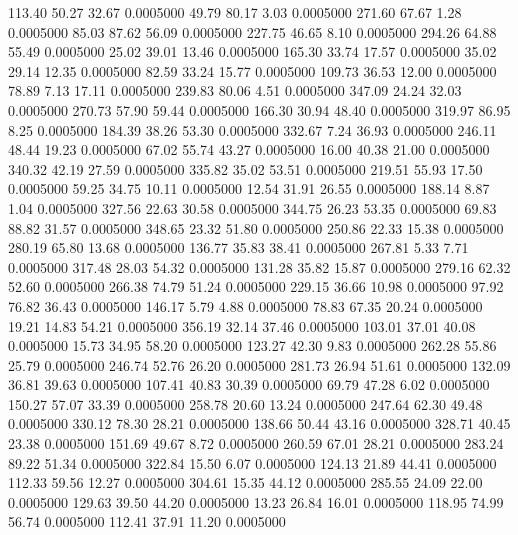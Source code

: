  113.40   50.27   32.67   0.0005000
  49.79   80.17    3.03   0.0005000
 271.60   67.67    1.28   0.0005000
  85.03   87.62   56.09   0.0005000
 227.75   46.65    8.10   0.0005000
 294.26   64.88   55.49   0.0005000
  25.02   39.01   13.46   0.0005000
 165.30   33.74   17.57   0.0005000
  35.02   29.14   12.35   0.0005000
  82.59   33.24   15.77   0.0005000
 109.73   36.53   12.00   0.0005000
  78.89    7.13   17.11   0.0005000
 239.83   80.06    4.51   0.0005000
 347.09   24.24   32.03   0.0005000
 270.73   57.90   59.44   0.0005000
 166.30   30.94   48.40   0.0005000
 319.97   86.95    8.25   0.0005000
 184.39   38.26   53.30   0.0005000
 332.67    7.24   36.93   0.0005000
 246.11   48.44   19.23   0.0005000
  67.02   55.74   43.27   0.0005000
  16.00   40.38   21.00   0.0005000
 340.32   42.19   27.59   0.0005000
 335.82   35.02   53.51   0.0005000
 219.51   55.93   17.50   0.0005000
  59.25   34.75   10.11   0.0005000
  12.54   31.91   26.55   0.0005000
 188.14    8.87    1.04   0.0005000
 327.56   22.63   30.58   0.0005000
 344.75   26.23   53.35   0.0005000
  69.83   88.82   31.57   0.0005000
 348.65   23.32   51.80   0.0005000
 250.86   22.33   15.38   0.0005000
 280.19   65.80   13.68   0.0005000
 136.77   35.83   38.41   0.0005000
 267.81    5.33    7.71   0.0005000
 317.48   28.03   54.32   0.0005000
 131.28   35.82   15.87   0.0005000
 279.16   62.32   52.60   0.0005000
 266.38   74.79   51.24   0.0005000
 229.15   36.66   10.98   0.0005000
  97.92   76.82   36.43   0.0005000
 146.17    5.79    4.88   0.0005000
  78.83   67.35   20.24   0.0005000
  19.21   14.83   54.21   0.0005000
 356.19   32.14   37.46   0.0005000
 103.01   37.01   40.08   0.0005000
  15.73   34.95   58.20   0.0005000
 123.27   42.30    9.83   0.0005000
 262.28   55.86   25.79   0.0005000
 246.74   52.76   26.20   0.0005000
 281.73   26.94   51.61   0.0005000
 132.09   36.81   39.63   0.0005000
 107.41   40.83   30.39   0.0005000
  69.79   47.28    6.02   0.0005000
 150.27   57.07   33.39   0.0005000
 258.78   20.60   13.24   0.0005000
 247.64   62.30   49.48   0.0005000
 330.12   78.30   28.21   0.0005000
 138.66   50.44   43.16   0.0005000
 328.71   40.45   23.38   0.0005000
 151.69   49.67    8.72   0.0005000
 260.59   67.01   28.21   0.0005000
 283.24   89.22   51.34   0.0005000
 322.84   15.50    6.07   0.0005000
 124.13   21.89   44.41   0.0005000
 112.33   59.56   12.27   0.0005000
 304.61   15.35   44.12   0.0005000
 285.55   24.09   22.00   0.0005000
 129.63   39.50   44.20   0.0005000
  13.23   26.84   16.01   0.0005000
 118.95   74.99   56.74   0.0005000
 112.41   37.91   11.20   0.0005000

